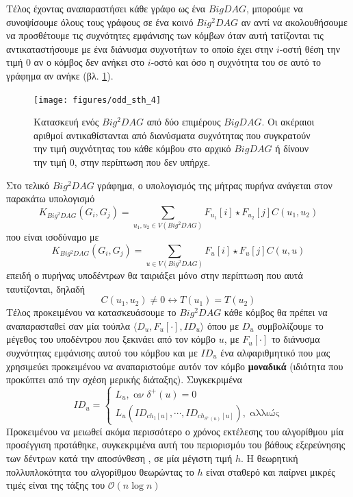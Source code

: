 Τέλος έχοντας αναπαραστήσει κάθε γράφο ως ένα $BigDAG$, μπορούμε να συνοψίσουμε όλους τους γράφους σε ένα κοινό $Big^{2}DAG$ αν αντί να ακολουθήσουμε να προσθέτουμε τις συχνότητες εμφάνισης των κόμβων όταν αυτή τατίζονται τις αντικαταστήσουμε με ένα διάνυσμα συχνοτήτων το οποίο έχει στην $i$-οστή θέση την τιμή $0$ αν ο κόμβος δεν ανήκει στο $i$-οστό και όσο η συχνότητα του σε αυτό το γράφημα αν ανήκε (βλ. \ref{fig:odd_sth_4}).
\begin{figure}[]
\centering
\texttt{[image: figures/odd\_sth\_4]}
\caption{Κατασκευή ενός $Big^{2}DAG$ από δύο επιμέρους $BigDAG$. Οι ακέραιοι αριθμοί αντικαθίστανται από διανύσματα συχνότητας που συγκρατούν την τιμή συχνότητας του κάθε κόμβου στο αρχικό $BigDAG$ ή δίνουν την τιμή $0$, στην περίπτωση που δεν υπήρχε.}
\label{fig:odd_sth_4}
\end{figure}

Στο τελικό $Big^{2}DAG$ γράφημα, ο υπολογισμός της μήτρας πυρήνα ανάγεται στον παρακάτω υπολογισμό
\begin{equation}
K_{Big^{2}DAG}(G_{i}, G_{j}) = \sum_{u_{1}, u_{2} \in V(Big^{2}DAG)} F_{u_{1}}[i] \star F_{u_{2}}[j] C(u_{1}, u_{2})
\end{equation}
που είναι ισοδύναμο με
\begin{equation}
K_{Big^{2}DAG}(G_{i}, G_{j}) = \sum_{u \in V(Big^{2}DAG)} F_{u}[i] \star F_{u}[j] C(u, u)
\end{equation}
επειδή ο πυρήνας υποδέντρων θα ταιριάξει μόνο στην περίπτωση που αυτά ταυτίζονται, δηλαδή
\begin{equation}
C(u_{1}, u_{2}) \not= 0 \leftrightarrow T(u_{1}) = T(u_{2})
\end{equation}
Τέλος προκειμένου να κατασκευάσουμε το $Big^{2}DAG$ κάθε κόμβος θα πρέπει να αναπαρασταθεί σαν μία τούπλα $\langle D_{u} , F_{u}[\cdot], ID_{u} \rangle$ όπου με $D_{u}$ συμβολίζουμε το μέγεθος του υποδέντρου που ξεκινάει από τον κόμβο $u$, με $F_{u}[\cdot]$ το διάνυσμα συχνότητας εμφάνισης αυτού του κόμβου και με $ID_{u}$ ένα αλφαριθμητικό που μας χρησιμεύει προκειμένου να αναπαριστούμε αυτόν τον κόμβο \textbf{μοναδικά} (ιδιότητα που προκύπτει από την σχέση μερικής διάταξης).
Συγκεκριμένα
\begin{equation}
ID_{u} = \begin{cases}
            L_{u},\;\text{αν}\;\delta^{+}(u)=0\\
            L_{u}(ID_{ch_{1}[u]}, \cdots, ID_{ch_{\delta^{+}(u)}[u]}),\;\text{αλλιώς}
        \end{cases}
\end{equation}
Προκειμένου να μειωθεί ακόμα περισσότερο ο χρόνος εκτέλεσης του αλγορίθμου μία προσέγγιση προτάθηκε, συγκεκριμένα αυτή του περιορισμόυ του βάθους εξερεύνησης των δέντρων  κατά την αποσύνθεση , σε μία μέγιστη τιμή $h$.
Η θεωρητική πολλυπλοκότητα του αλγορίθμου θεωρώντας το $h$ είναι σταθερό και παίρνει μικρές τιμές είναι της τάξης του $\mathcal{O}(n\log n)$ \cite[]{Martino2012ATK}
